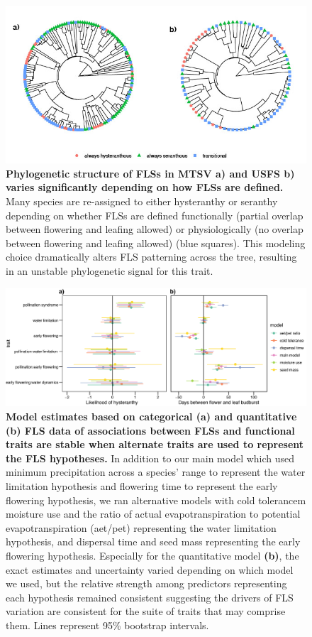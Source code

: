 \documentclass[11pt]{article}
\begin{document}
\begin{figure}[H]
\centering
\includegraphics[width=\textwidth]{..//..//cicletrees.jpg} 
\caption{\textbf{Phylogenetic structure of FLSs in MTSV \textbf{a)} and USFS \textbf{b)} varies significantly depending on how FLSs are defined.} Many species are re-assigned to either hysteranthy or seranthy depending on whether FLSs are defined functionally (partial overlap between flowering and leafing allowed) or physiologically (no overlap between flowering and leafing allowed) (blue squares). This modeling choice dramatically alters FLS patterning across the tree, resulting in an unstable phylogenetic signal for this trait.}
\label{fig:phylogeny}
\end{figure}

\begin{figure}[H]
\centering
\includegraphics[width=\textwidth]{..//..//alternatepredictors.png} 
\caption{\textbf{Model estimates based on categorical (a) and quantitative (b) FLS data of associations between FLSs and functional traits are stable when alternate traits are used to represent the FLS hypotheses.} In addition to our main model which used minimum precipitation across a species' range to represent the water limitation hypothesis and flowering time to represent the early flowering hypothesis, we ran alternative models with cold tolerancem moisture use and the ratio of actual evapotranspiration to potential evapotranspiration (aet/pet) representing the water limitation hypothesis, and dispersal time and seed mass representing the early flowering hypothesis. Especially for the quantitative model \textbf{(b)}, the exact estimates and uncertainty varied depending on which model we used, but the relative strength among predictors representing each hypothesis remained consistent suggesting the drivers of FLS variation are consistent for the suite of traits that may comprise them. Lines represent 95\% bootstrap intervals.} 
\label{fig:altpreds}
\end{figure}
\end{document}
